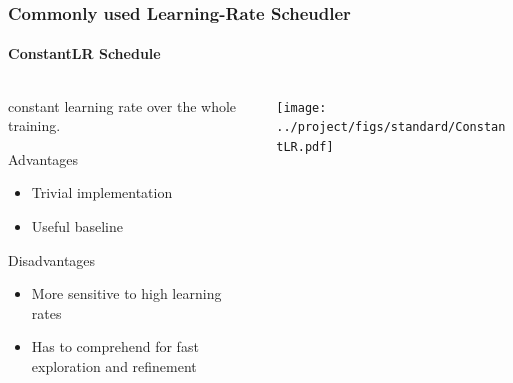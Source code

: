\documentclass[10pt,aspectratio=169]{beamer}
\begin{document}
    \begin{frame}
        \frametitle{Commonly used Learning-Rate Scheudler}        
        \framesubtitle{ConstantLR Schedule}
        
        \begin{columns}
            \begin{column}{0.5\textwidth}
                constant learning rate over the whole training. 
                \vspace{0.5cm}

                Advantages
                \begin{itemize}
                    \item Trivial implementation
                    \item Useful baseline
                \end{itemize}

                Disadvantages
                \begin{itemize}
                    \item More sensitive to high learning rates
                    \item Has to comprehend for fast exploration and refinement
                \end{itemize}
            \end{column}
            \begin{column}{0.5\textwidth}
                \texttt{[image: ../project/figs/standard/ConstantLR.pdf]}
            \end{column}
        \end{columns}
    \end{frame}
\end{document}
